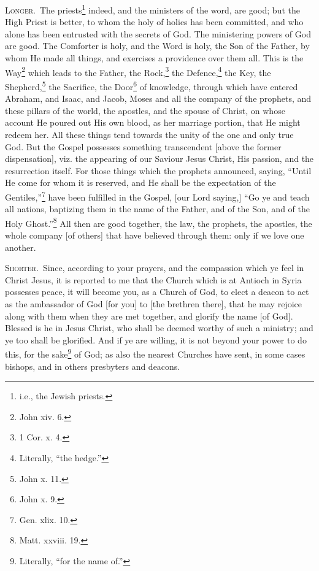 \textsc{Longer.}~The priests\footnote{i.e., the Jewish priests.} indeed, and the ministers of the word, are good; but the High Priest is better, to whom the holy of holies has been committed, and who alone has been entrusted with the secrets of God. The ministering powers of God are good. The Comforter is holy, and the Word is holy, the Son of the Father, by whom He made all things, and exercises a providence over them all. This is the Way\footnote{John xiv. 6.} which leads to the Father, the Rock,\footnote{1 Cor. x. 4.} the Defence,\footnote{Literally, “the hedge.”} the Key, the Shepherd,\footnote{John x. 11.} the Sacrifice, the Door\footnote{John x. 9.} of knowledge, through which have entered Abraham, and Isaac, and Jacob, Moses and all the company of the prophets, and these pillars of the world, the apostles, and the spouse of Christ, on whose account He poured out His own blood, as her marriage portion, that He might redeem her. All these things tend towards the unity of the one and only true God. But the Gospel possesses something transcendent [above the former dispensation], viz. the appearing of our Saviour Jesus Christ, His passion, and the resurrection itself. For those things which the prophets announced, saying, “Until He come for whom it is reserved, and He shall be the expectation of the Gentiles,”\footnote{Gen. xlix. 10.} have been fulfilled in the Gospel, [our Lord saying,] “Go ye and teach all nations, baptizing them in the name of the Father, and of the Son, and of the Holy Ghost.”\footnote{Matt. xxviii. 19.} All then are good together, the law, the prophets, the apostles, the whole company [of others] that have believed through them: only if we love one another.


\textsc{Shorter.}~Since, according to your prayers, and the compassion which ye feel in Christ Jesus, it is reported to me that the Church which is at Antioch in Syria possesses peace, it will become you, as a Church of God, to elect a deacon to act as the ambassador of God [for you] to [the brethren there], that he may rejoice along with them when they are met together, and glorify the name [of God]. Blessed is he in Jesus Christ, who shall be deemed worthy of such a ministry; and ye too shall be glorified. And if ye are willing, it is not beyond your power to do this, for the sake\footnote{Literally, “for the name of.”} of God; as also the nearest Churches have sent, in some cases bishops, and in others presbyters and deacons.

